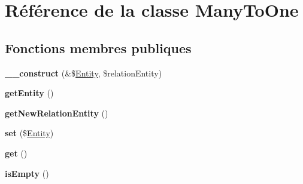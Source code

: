 \hypertarget{class_o_r_m_1_1_entity_1_1_mapping_1_1_many_to_one}{}\section{Référence de la classe Many\+To\+One}
\label{class_o_r_m_1_1_entity_1_1_mapping_1_1_many_to_one}
\subsection*{Fonctions membres publiques}
\begin{DoxyCompactItemize}
\item 
{\bfseries \+\_\+\+\_\+construct} (\&\$\hyperlink{class_o_r_m_1_1_entity_1_1_entity}{Entity}, \$relation\+Entity)\hypertarget{class_o_r_m_1_1_entity_1_1_mapping_1_1_many_to_one_a53d657cfdd1576b9c548fa471f7d2ffd}{}\label{class_o_r_m_1_1_entity_1_1_mapping_1_1_many_to_one_a53d657cfdd1576b9c548fa471f7d2ffd}

\item 
{\bfseries get\+Entity} ()\hypertarget{class_o_r_m_1_1_entity_1_1_mapping_1_1_many_to_one_a0848c661e55b6027e3794d16cad5d501}{}\label{class_o_r_m_1_1_entity_1_1_mapping_1_1_many_to_one_a0848c661e55b6027e3794d16cad5d501}

\item 
{\bfseries get\+New\+Relation\+Entity} ()\hypertarget{class_o_r_m_1_1_entity_1_1_mapping_1_1_many_to_one_a9f30dc1e39a3bf0771d239e078c18c4a}{}\label{class_o_r_m_1_1_entity_1_1_mapping_1_1_many_to_one_a9f30dc1e39a3bf0771d239e078c18c4a}

\item 
{\bfseries set} (\$\hyperlink{class_o_r_m_1_1_entity_1_1_entity}{Entity})\hypertarget{class_o_r_m_1_1_entity_1_1_mapping_1_1_many_to_one_aa41627fdd0d56b8a70a647b8181fdd87}{}\label{class_o_r_m_1_1_entity_1_1_mapping_1_1_many_to_one_aa41627fdd0d56b8a70a647b8181fdd87}

\item 
{\bfseries get} ()\hypertarget{class_o_r_m_1_1_entity_1_1_mapping_1_1_many_to_one_ac33ee765f5ad9f134540bac393721cfe}{}\label{class_o_r_m_1_1_entity_1_1_mapping_1_1_many_to_one_ac33ee765f5ad9f134540bac393721cfe}

\item 
{\bfseries is\+Empty} ()\hypertarget{class_o_r_m_1_1_entity_1_1_mapping_1_1_many_to_one_aedcc52b3673b8df9425e52f13accb2a1}{}\label{class_o_r_m_1_1_entity_1_1_mapping_1_1_many_to_one_aedcc52b3673b8df9425e52f13accb2a1}

\end{DoxyCompactItemize}

